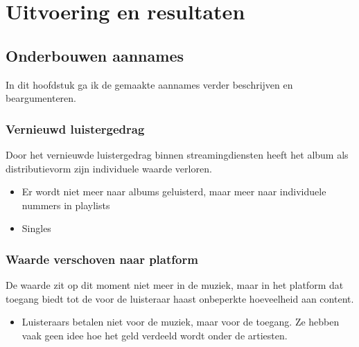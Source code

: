 \section{Uitvoering en resultaten}

\subsection{Onderbouwen aannames}

In dit hoofdstuk ga ik de gemaakte aannames verder beschrijven en beargumenteren.


\subsubsection*{Vernieuwd luistergedrag}

\begin{quotebox}
Door het vernieuwde luistergedrag binnen streamingdiensten heeft het album als distributievorm zijn individuele waarde verloren.
\end{quotebox}
\begin{itemize}
  \item Er wordt niet meer naar albums geluisterd, maar meer naar individuele nummers in playlists
  \item Singles
\end{itemize}

\subsubsection*{Waarde verschoven naar platform}
\begin{quotebox}
De waarde zit op dit moment niet meer in de muziek, maar in het platform dat toegang biedt tot de voor de luisteraar haast onbeperkte hoeveelheid aan content.
\end{quotebox}
\begin{itemize}
  \item Luisteraars betalen niet voor de muziek, maar voor de toegang. Ze hebben vaak geen idee hoe het geld verdeeld wordt onder de artiesten.
\end{itemize}

